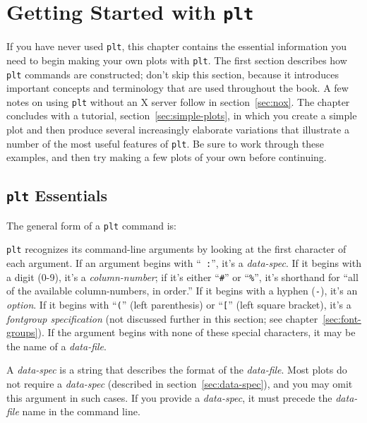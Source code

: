 \documentclass{book}
\begin{document}
\chapter{Getting Started with {\tt plt}\label{sec:getting-started}}

If you have never used {\tt plt}, this chapter contains the essential
information you need to begin making your own plots with {\tt plt}.  The first
section describes how {\tt plt} commands are constructed; don't skip this
section, because it introduces important concepts and terminology that are used
throughout the book.  A few notes on using {\tt plt} without an X server follow
in section~\ref{sec:nox}.  The chapter concludes with a tutorial,
section~\ref{sec:simple-plots}, in which you create a simple plot and then
produce several increasingly elaborate variations that illustrate a number of
the most useful features of {\tt plt}.  Be sure to work through these examples,
and then try making a few plots of your own before continuing.

\section{{\tt plt} Essentials\label{sec:essentials}}

%
%
The general form of a {\tt plt} command is:
\begin{center}
\end{center}

%
%
{\tt plt} recognizes its command-line arguments by looking at the
first character of each argument.  If an argument begins with ``{\tt
:}'', it's a {\em data-spec}.  If it begins with a digit (0-9), it's a
{\em column-number}; if it's either ``{\tt \#}'' or ``{\tt \%}'', it's
shorthand for ``all of the available column-numbers, in order.''  If
it begins with a hyphen ({\tt -}), it's an {\em option}.  If it begins
with ``{\tt (}'' (left parenthesis) or ``{\tt [}'' (left square
bracket), it's a {\em fontgroup specification} (not discussed further
in this section; see chapter~\ref{sec:font-groups}).  If the argument
begins with none of these special characters, it may be the name of a
{\em data-file}.

A {\em data-spec} is a string that describes the format of the {\em
data-file}.  Most plots do not require a {\em data-spec} (described in
section~\ref{sec:data-spec}), and you may omit this argument in such
cases.  If you provide a {\em data-spec}, it must precede the {\em
data-file} name in the command line.
\end{document}
